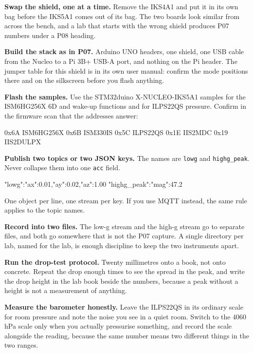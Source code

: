 \begin{steps}
\item \textbf{Swap the shield, one at a time.} Remove the IKS4A1 and put it in its own bag
before the IKS5A1 comes out of its bag. The two boards look similar from across the bench,
and a lab that starts with the wrong shield produces P07 numbers under a P08 heading.

\item \textbf{Build the stack as in P07.} Arduino UNO headers, one shield, one USB cable
from the Nucleo to a Pi 3B+ USB-A port, and nothing on the Pi header. The jumper table for
this shield is in its own user manual: confirm the mode positions there and on the
silkscreen before you flash anything.

\item \textbf{Flash the samples.} Use the STM32duino X-NUCLEO-IKS5A1 samples for the
ISM6HG256X 6D and wake-up functions and for ILPS22QS pressure. Confirm in the firmware scan
that the addresses answer:
\begin{plaincode}
0x6A ISM6HG256X   0x6B ISM330IS   0x5C ILPS22QS   0x1E IIS2MDC   0x19 IIS2DULPX
\end{plaincode}

\item \textbf{Publish two topics or two JSON keys.} The names are \texttt{lowg} and
\texttt{highg\_peak}. Never collapse them into one \texttt{acc} field.
\begin{plaincode}
{"lowg":{"ax":0.01,"ay":0.02,"az":1.00}}
{"highg_peak":{"mag":47.2}}
\end{plaincode}
One object per line, one stream per key. If you use MQTT instead, the same rule applies to
the topic names.

\item \textbf{Record into two files.} The low-g stream and the high-g stream go to separate
files, and both go somewhere that is not the P07 capture. A single directory per lab, named
for the lab, is enough discipline to keep the two instruments apart.

\item \textbf{Run the drop-test protocol.} Twenty millimetres onto a book, not onto
concrete. Repeat the drop enough times to see the spread in the peak, and write the drop
height in the lab book beside the numbers, because a peak without a height is not a
measurement of anything.

\item \textbf{Measure the barometer honestly.} Leave the ILPS22QS in its ordinary scale for
room pressure and note the noise you see in a quiet room. Switch to the 4060 hPa scale only
when you actually pressurise something, and record the scale alongside the reading, because
the same number means two different things in the two ranges.
\end{steps}

